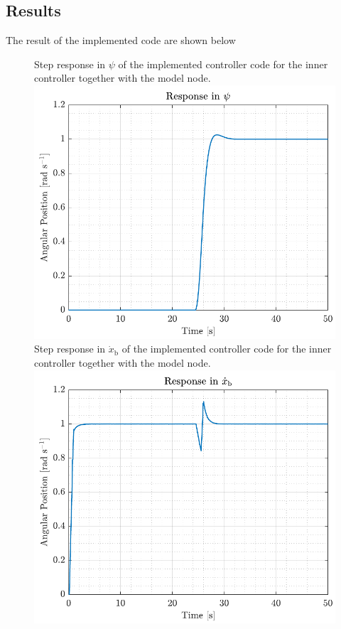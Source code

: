 \subsection*{Results}
The result of the implemented code are shown below
\begin{figure}[H]
    \captionbox  
    {  
        Step response in $\psi$ of the implemented controller code for the inner controller together with the model node.
        \label{fig:model_node_yaw}                                
    }                                                                 
    {                                                                  
        \includegraphics[width=.45\textwidth]{figures/model_node_yaw}         
    }                                                                    
    \hspace{5pt}                                                  
    \captionbox
    {    
        Step response in $\dot{x}_\mathrm{b}$ of the implemented controller code for the inner controller together with the model node.    
        \label{fig:model_node_xbdot}                               
    }                                                                  
    {                                                                    
        \includegraphics[width=.45\textwidth]{figures/model_node_xbdot}         
    }                                                                         
\end{figure}

